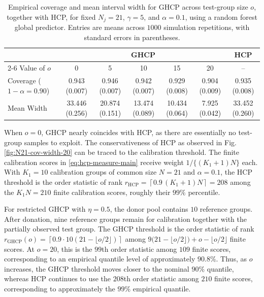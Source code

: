 \begin{table}[t]
\centering
\caption{Empirical coverage and mean interval width for GHCP across test-group size $o$, together with HCP, for fixed $N_j=21$, $\gamma=5$, and $\alpha=0.1$, using a random forest global predictor. Entries are means across $1000$ simulation repetitions, with standard errors in parentheses.}
\label{tab:dhcp-hcp-alpha01}
\small
\setlength{\tabcolsep}{6pt}
\begin{tabular}{lcccccc}
\toprule
& \multicolumn{5}{c}{GHCP} & HCP \\
\cmidrule(lr){2-6}
Value of $o$ & 0 & 5 & 10 & 15 & 20 & -- \\
\midrule
Coverage ($1-\alpha=0.90$)
& 0.943 (0.007)
& 0.946 (0.007)
& 0.942 (0.007)
& 0.929 (0.008)
& 0.904 (0.009)
& 0.935 (0.008) \\
Mean Width
& 33.446 (0.256)
& 20.874 (0.151)
& 13.474 (0.089)
& 10.434 (0.064)
& 7.925 (0.042)
& 33.452 (0.260) \\
\bottomrule
\end{tabular}
\end{table}




When $o=0$, GHCP nearly coincides with HCP, as there are essentially no test-group samples to exploit. The conservativeness of HCP as observed in Fig. \ref{fig:N21-cov-width-20} can be traced to the calibration threshold. The finite calibration scores in \eqref{eq:hcp-measure-main} receive weight $1/\{(K_1+1)N\}$ each. With $K_1=10$ calibration groups of common size $N=21$ and $\alpha=0.1$, the HCP threshold is the order statistic of rank $r_{\mathrm{HCP}}=\left\lceil 0.9\,(K_1+1)N\right\rceil=208$ among the $K_1N=210$ finite calibration scores, roughly their $99\%$ percentile.

For restricted GHCP with $\eta=0.5$, the donor pool contains $10$
reference groups. After donation, nine reference groups remain for
calibration together with the partially observed test group. The GHCP
threshold is the order statistic of rank $r_{\mathrm{GHCP}}(o)=\left\lceil
0.9\cdot 10(21-\lfloor o/2\rfloor)\right\rceil$ among $9\bigl(21-\lfloor o/2\rfloor\bigr) + o-\lfloor o/2\rfloor$ finite scores. At $o=20$, this is the $99$th order statistic among $109$ finite scores, corresponding to an empirical quantile level of approximately $90.8\%$. Thus, as $o$ increases, the GHCP threshold moves closer to the nominal $90\%$ quantile, whereas HCP continues to use the $208$th order statistic among $210$ finite scores, corresponding to approximately the $99\%$ empirical quantile.

